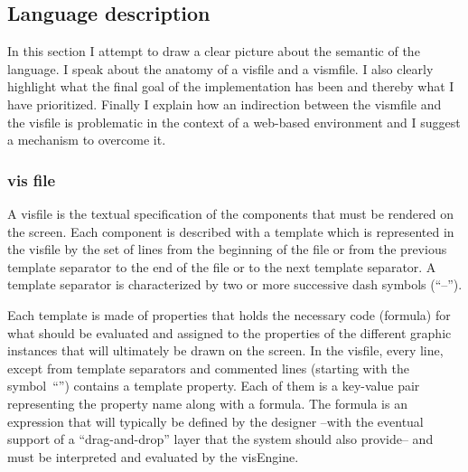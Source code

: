 \subsection{Language description}
\label{sec:languageDescription}
In this section I attempt to draw a clear picture about the semantic of the language. I speak about the anatomy of a visfile and a vismfile. I also clearly highlight what the final goal of the implementation has been and thereby what I have prioritized. Finally I explain how an indirection between the vismfile and the visfile is problematic in the context of a web-based environment and I suggest a mechanism to overcome it.

\subsubsection{vis file}



A visfile is the textual specification of the components that must be rendered on the screen. Each component is described with a template which is represented in the visfile by the set of lines from the beginning of the file or from the previous template separator to the end of the file or to the next template separator. A template separator is characterized by two or more successive dash symbols (``--'').

Each template is made of properties that holds the necessary code (formula) for what should be evaluated and assigned to the properties of the different graphic instances that will ultimately be drawn on the screen. In the visfile, every line, except from template separators and commented lines (starting with the symbol~``\textquotesingle'') contains a template property. Each of them is a key-value pair representing the property name along with a formula. The formula is an expression that will typically be defined by the designer --with the eventual support of a ``drag-and-drop'' layer that the system should also provide-- and must be interpreted and evaluated by the visEngine.

